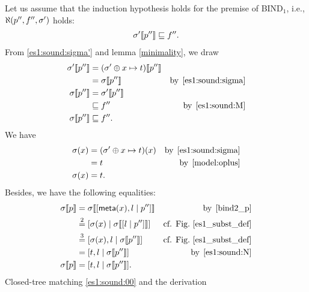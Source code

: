 \begin{enumerate}
\begin{enumerate}
      \end{enumerate}
      Let us assume that the induction hypothesis holds for the
      premise of \textsf{BIND}\(_1\), i.e., 
      \(\ind{U}(p'', f'', \sigma')\) holds:
      \begin{gather}
        \subst{p''}{\sigma'} \sqsubseteq f''. \label{es1:sound:M}
      \end{gather}
      From \ref{es1:sound:sigma'} and lemma \ref{minimality}, we draw
      \begin{align}
           \subst{p''}{\sigma'} 
        &= \subst{p''}{(\sigma' \oplus x \mapsto
             t)}\notag\\
        &= \subst{p''}{\sigma}
        &\text{by} \,\; \text{\ref{es1:sound:sigma}}\notag\\
           \subst{p''}{\sigma}
        &= \subst{p''}{\sigma'}\notag\\
        &\sqsubseteq f''
        &\text{by} \,\; \eqref{es1:sound:M}\notag\\
           \subst{p''}{\sigma}
        &\sqsubseteq f''. \label{es1:sound:00}
      \end{align}
      We have
      \begin{align}
           \sigma(x) 
        &= (\sigma' \oplus x \mapsto t)(x)
        &\text{by} \,\; \text{\ref{es1:sound:sigma}}\notag\\
        &= t
        &\text{by} \,\; \eqref{model:oplus}\notag\\
           \sigma(x) 
        &= t. \label{es1:sound:N}
      \end{align}
      Besides, we have the following equalities:
      \begin{align}
          \subst{p}{\sigma} 
        &= \subst{\cons{\meta{x},l}{p''}}{\sigma}
        &\text{by} \,\; \text{\ref{bind2_p}}\notag\\
        &\eqn{2}
          \cons{\sigma(x)}{\subst{\cons{l}{p''}}{\sigma}}
        &\text{cf. Fig.~\ref{es1_subst_def}}\notag\\
        &\eqn{3}
          \cons{\sigma(x),l}{\subst{p''}{\sigma}}
        &\text{cf. Fig.~\ref{es1_subst_def}}\notag\\
        &= \cons{t,l}{\subst{p''}{\sigma}}
        &\text{by} \,\; \eqref{es1:sound:N}\notag\\
          \subst{p}{\sigma} 
        &=
          \cons{t,l}{\subst{p''}{\sigma}}. \label{es1:sound:13}
      \end{align}
      Closed\hyp{}tree matching \eqref{es1:sound:00} and the derivation

\end{enumerate}
